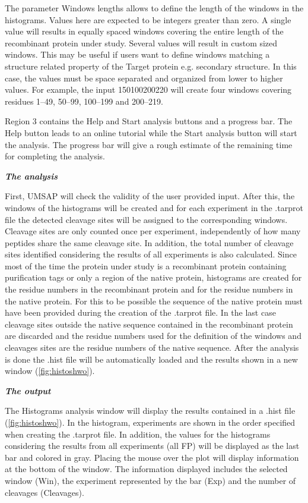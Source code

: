 The parameter Windows lengths allows to define the length of the windows in the histograms. Values here are expected to be integers greater than zero. A single value will results in equally spaced windows covering the entire length of the recombinant protein under study. Several values will result in custom sized windows. This may be useful if users want to define windows matching a structure related property of the Target protein e.g. secondary structure. In this case, the values must be space separated and organized from lower to higher values. For example, the input \numlist{1 50 100 200 220} will create four windows covering residues \numrange{1}{49}, \numrange{50}{99}, \numrange{100}{199} and \numrange{200}{219}.

Region \num{3} contains the Help and Start analysis buttons and a progress bar. The Help button leads to an online tutorial while the Start analysis button will start the analysis. The progress bar will give a rough estimate of the remaining time for completing the analysis.

\textit{\textbf{The analysis}}

First, UMSAP will check the validity of the user provided input. After this, the windows of the histograms will be created and for each experiment in the .tarprot file the detected cleavage sites will be assigned to the corresponding windows. Cleavage sites are only counted once per experiment, independently of how many peptides share the same cleavage site. In addition, the total number of cleavage sites identified considering the results of all experiments is also calculated. Since most of the time the protein under study is a recombinant protein containing purification tags or only a region of the native protein, histograms are created for the residue numbers in the recombinant protein and for the residue numbers in the native protein. For this to be possible the sequence of the native protein must have been provided during the creation of the .tarprot file. In the last case cleavage sites outside the native sequence contained in the recombinant protein are discarded and the residue numbers used for the definition of the windows and cleavages sites are the residue numbers of the native sequence. After the analysis is done the .hist file will be automatically loaded and the results shown in a new window (\autoref{fig:histoshwo}).

\textit{\textbf{The output}}

The Histograms analysis window will display the results contained in a .hist file (\autoref{fig:histoshwo}). In the histogram, experiments are shown in the order specified when creating the .tarprot file. In addition, the values for the histograms considering the results from all experiments (all FP) will be displayed as the last bar and colored in gray. Placing the mouse over the plot will display information at the bottom of the window. The information displayed includes the selected window (Win), the experiment represented by the bar (Exp) and the number of cleavages (Cleavages).

